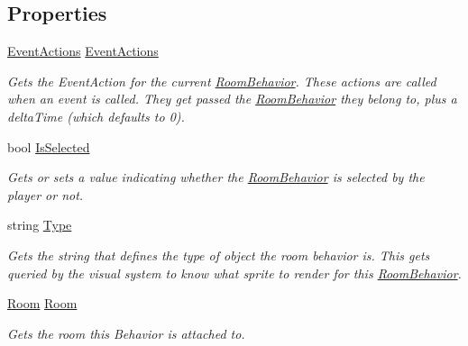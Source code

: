\subsection*{Properties}
\begin{DoxyCompactItemize}
\item 
\hyperlink{class_event_actions}{Event\+Actions} \hyperlink{class_project_porcupine_1_1_rooms_1_1_room_behavior_a0f890f9fdbf836d50cbc6e2ea8f8aaec}{Event\+Actions}
\begin{DoxyCompactList}\small\item\em Gets the Event\+Action for the current \hyperlink{class_project_porcupine_1_1_rooms_1_1_room_behavior}{Room\+Behavior}. These actions are called when an event is called. They get passed the \hyperlink{class_project_porcupine_1_1_rooms_1_1_room_behavior}{Room\+Behavior} they belong to, plus a delta\+Time (which defaults to 0). \end{DoxyCompactList}\item 
bool \hyperlink{class_project_porcupine_1_1_rooms_1_1_room_behavior_a036e3155df45c58acefa7ef0d41e394f}{Is\+Selected}
\begin{DoxyCompactList}\small\item\em Gets or sets a value indicating whether the \hyperlink{class_project_porcupine_1_1_rooms_1_1_room_behavior}{Room\+Behavior} is selected by the player or not. \end{DoxyCompactList}\item 
string \hyperlink{class_project_porcupine_1_1_rooms_1_1_room_behavior_a7b19b205c62a475bc5d70aecba6d0eb9}{Type}
\begin{DoxyCompactList}\small\item\em Gets the string that defines the type of object the room behavior is. This gets queried by the visual system to know what sprite to render for this \hyperlink{class_project_porcupine_1_1_rooms_1_1_room_behavior}{Room\+Behavior}. \end{DoxyCompactList}\item 
\hyperlink{class_project_porcupine_1_1_rooms_1_1_room}{Room} \hyperlink{class_project_porcupine_1_1_rooms_1_1_room_behavior_af4e0d68fcb704cb98fe634e7e1847760}{Room}
\begin{DoxyCompactList}\small\item\em Gets the room this Behavior is attached to. \end{DoxyCompactList}\item 

\end{DoxyCompactItemize}

